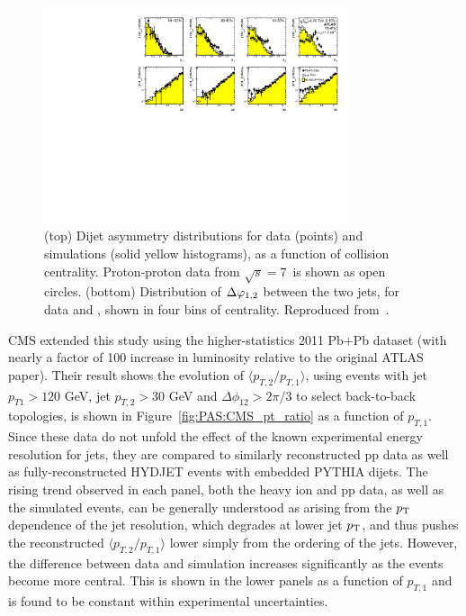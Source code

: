 \begin{figure}[!thb]
\begin{center}
\includegraphics[width=0.8\textwidth]{jetfigures/final_4x2_23_newpp.pdf}
\caption{
(top) Dijet asymmetry distributions for data (points) and {} 
simulations (solid yellow histograms), as a function of collision centrality.  
Proton-proton data from $\sqrt{s}=7$\TeV\ is shown as open circles.
(bottom) Distribution of $\Delta\varphi_{1,2}$ between the two jets, 
for data and {}, shown in four bins of centrality.
Reproduced from~\cite{Aad:2010bu}.}
\label{fig:pas:final_4x2}
\end{center}
\end{figure}

CMS extended this study using the higher-statistics 2011 Pb+Pb dataset (with nearly a
factor of 100 increase in luminosity relative to the original ATLAS paper).
Their result shows the evolution of $\langle p_{T,2}/p_{T,1} \rangle$, 
using events with jet $p_{T1} > 120$ GeV, jet $p_{T,2} > 30$ GeV
and $\Delta\phi_{12} > 2\pi/3$ to select back-to-back topologies, is shown in Figure~\ref{fig:PAS:CMS_pt_ratio}
as a function of $p_{T,1}$.
Since these data do not unfold the effect of the known experimental energy resolution for jets,
they are compared to similarly reconstructed pp data as well as fully-reconstructed HYDJET events
with embedded PYTHIA dijets.
The rising trend observed in each panel, both the heavy ion and pp data, as well as the simulated events,
can be generally understood as arising from the $\mbox{$p_{\mathrm{T}}$}$ dependence of the jet resolution, which degrades at lower
jet $\mbox{$p_{\mathrm{T}}$}$, and thus pushes the reconstructed $\langle p_{T,2}/p_{T,1} \rangle$ lower simply from the 
ordering of the jets.
However, the difference between data and simulation increases significantly as the events become more
central.  This is shown in the lower panels as a function of $p_{T,1}$ and is found to be constant within
experimental uncertainties.

